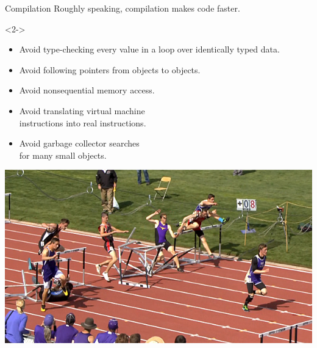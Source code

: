 \documentclass[aspectratio=169]{beamer}
\begin{document}
\begin{frame}{Compilation}
\Large
\vspace{0.5 cm}
Roughly speaking, compilation makes code faster.

\vspace{0.5 cm}
\large

\vspace{0.5 cm}
\begin{uncoverenv}<2->
\hfill\begin{minipage}{0.97\linewidth}
\begin{itemize}
\item Avoid type-checking every value in a loop over identically typed data.
\item Avoid following pointers from objects to objects.
\item Avoid nonsequential memory access.
\item Avoid translating virtual machine \\ instructions into real instructions.
\item Avoid garbage collector searches \\ for many small objects.
\end{itemize}
\end{minipage}

\vspace{-2.5 cm}
\hfill \includegraphics[width=5.5 cm]{hurdle9.jpg}
\end{uncoverenv}
\end{frame}
\end{document}
